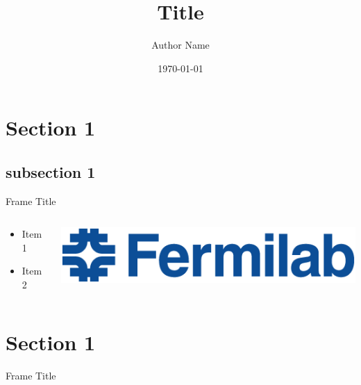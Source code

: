 \documentclass[xcolor=dvipsnames,18]{beamer}
\title[Short title]{Title}
\author[A.Mohsen]
{Author Name}
\date{\today}
\begin{document}
\begin{frame}
\titlepage
\end{frame}
\section{Section 1}
\subsection{subsection 1}
\begin{frame}{Frame Title}
\begin{columns}
\begin{column}{0.45\textwidth}
\centering
\begin{itemize}
    \item Item 1
    \item Item 2
\end{itemize}
\end{column}
\begin{column}{0.45\textwidth}
\centering
\includegraphics[width=1\linewidth]{FNAL-Logo-NAL-Blue.png}\\
\end{column}
\end{columns}
\end{frame}
\section{Section 1}
\begin{frame}{Frame Title}
    
\end{frame}
\end{document}

